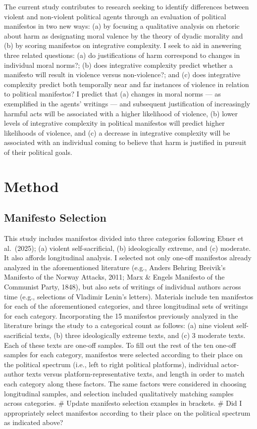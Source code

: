 \documentclass[
  english,
  man]{apa6}
\begin{document}
The current study contributes to research seeking to identify differences between violent and non-violent political agents through an evaluation of political manifestos in two new ways: (a) by focusing a qualitative analysis on rhetoric about harm as designating moral valence by the theory of dyadic morality and (b) by scoring manifestos on integrative complexity. I seek to aid in answering three related questions: (a) do justifications of harm correspond to changes in individual moral norms?; (b) does integrative complexity predict whether a manifesto will result in violence versus non-violence?; and (c) does integrative complexity predict both temporally near and far instances of violence in relation to political manifestos? I predict that (a) changes in moral norms --- as exemplified in the agents' writings --- and subsequent justification of increasingly harmful acts will be associated with a higher likelihood of violence, (b) lower levels of integrative complexity in political manifestos will predict higher likelihoods of violence, and (c) a decrease in integrative complexity will be associated with an individual coming to believe that harm is justified in pursuit of their political goals.

\section{Method}\label{method}

\subsection{Manifesto Selection}\label{manifesto-selection}

This study includes manifestos divided into three categories following Ebner et al.~(2025); (a) violent self-sacrificial, (b) ideologically extreme, and (c) moderate. It also affords longitudinal analysis. I selected not only one-off manifestos already analyzed in the aforementioned literature (e.g., Anders Behring Breivik's Manifesto of the Norway Attacks, 2011; Marx \& Engels Manifesto of the Communist Party, 1848), but also sets of writings of individual authors across time (e.g., selections of Vladimir Lenin's letters). Materials include ten manifestos for each of the aforementioned categories, and three longitudinal sets of writings for each category. Incorporating the 15 manifestos previously analyzed in the literature brings the study to a categorical count as follows: (a) nine violent self-sacrificial texts, (b) three ideologically extreme texts, and (c) 3 moderate texts. Each of these texts are one-off samples. To fill out the rest of the ten one-off samples for each category, manifestos were selected according to their place on the political spectrum (i.e., left to right political platforms), individual actor-author texts versus platform-representative texts, and length in order to match each category along these factors. The same factors were considered in choosing longitudinal samples, and selection included qualitatively matching samples across categories.
\#\textbar{} Update manifesto selection examples in brackets.
\#\textbar{} Did I appropriately select manifestos according to their place on the political spectrum as indicated above?
\end{document}
